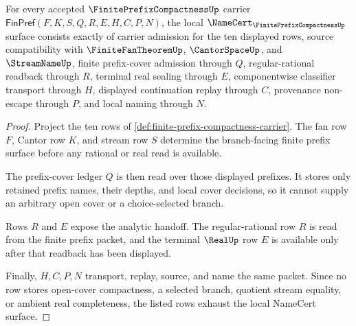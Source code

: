 \begin{theorem}\label{thm:finite-prefix-compactness-namecert-obligations}
For every accepted $\FinitePrefixCompactnessUp$ carrier $\mathsf{FinPref}(F,K,S,Q,R,E,H,C,P,N)$, the local $\NameCert_{\FinitePrefixCompactnessUp}$ surface consists exactly of carrier admission for the ten displayed rows, source compatibility with $\FiniteFanTheoremUp$, $\CantorSpaceUp$, and $\StreamNameUp$, finite prefix-cover admission through $Q$, regular-rational readback through $R$, terminal real sealing through $E$, componentwise classifier transport through $H$, displayed continuation replay through $C$, provenance non-escape through $P$, and local naming through $N$.
\end{theorem}
\begin{proof}
Project the ten rows of \autoref{def:finite-prefix-compactness-carrier}. The fan row $F$, Cantor row $K$, and stream row $S$ determine the branch-facing finite prefix surface before any rational or real read is available.

The prefix-cover ledger $Q$ is then read over those displayed prefixes. It stores only retained prefix names, their depths, and local cover decisions, so it cannot supply an arbitrary open cover or a choice-selected branch.

Rows $R$ and $E$ expose the analytic handoff. The regular-rational row $R$ is read from the finite prefix packet, and the terminal $\RealUp$ row $E$ is available only after that readback has been displayed.

Finally, $H,C,P,N$ transport, replay, source, and name the same packet. Since no row stores open-cover compactness, a selected branch, quotient stream equality, or ambient real completeness, the listed rows exhaust the local NameCert surface.
\end{proof}

